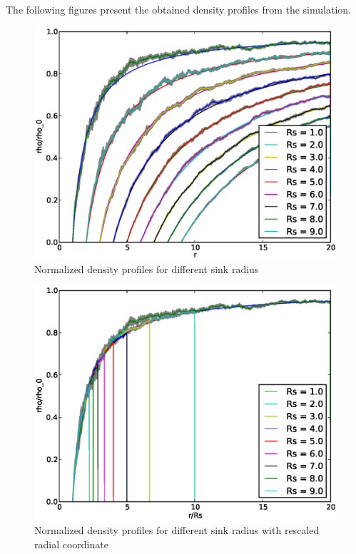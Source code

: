 The following figures present the obtained density profiles from the simulation.
\begin{figure}[H]
    \centering
    \includegraphics[width = .8 \textwidth]{plots/np/rs/rho_over_rho0.eps} 
    \caption{Normalized density profiles for different sink radius}
    \label{fig:ror0Rs}
\end{figure}
\begin{figure}[H]
    \centering
    \includegraphics[width = .8 \textwidth]{plots/np/rs/rho_over_rho_0_rescaled.eps} 
    \caption{Normalized density profiles for different sink radius with rescaled radial coordinate}
    \label{fig:ror0Rs_rescaled}
\end{figure}
\newpage
